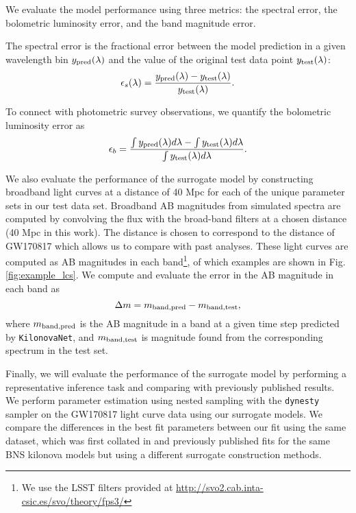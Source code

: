 \documentclass[fleqn,usenatbib,useAMS]{mnras}
\begin{document}
We evaluate the model performance using three metrics: the spectral error, the bolometric luminosity error, and the band magnitude error. 

The spectral error is the fractional error between the model prediction in a given wavelength bin $y_{\rm pred}(\lambda)$ and the value of the original test data point $y_{\rm test}(\lambda)$:
\begin{equation}
     \epsilon_{s}(\lambda) =  \frac{y_{\rm pred}(\lambda) - y_{\rm test}(\lambda)}{y_{\rm test}(\lambda)}.
\end{equation}

\noindent To connect with photometric survey observations, we quantify the bolometric luminosity error as
\begin{equation}
    \epsilon_b =  \frac{\int y_{\rm pred}(\lambda)d\lambda - \int y_{\rm test}(\lambda)d \lambda}{\int y_{\rm test}(\lambda) d \lambda}.
\end{equation}

\noindent We also evaluate the performance of the surrogate model by constructing broadband light curves at a distance of 40 Mpc for each of the unique parameter sets in our test data set.
Broadband AB magnitudes from simulated spectra are computed by convolving the flux with the broad-band filters at a chosen distance (40 Mpc in this work).
The distance is chosen to correspond to the distance of GW170817 which allows us to compare with past analyses.
These light curves are computed as AB magnitudes in each band\footnote{We use the LSST filters provided at \url{http://svo2.cab.inta-csic.es/svo/theory/fps3/}}, of which examples are shown in Fig.~ \ref{fig:example_lcs}.
We compute and evaluate the error in the AB magnitude in each band as
\begin{equation}
\Delta m = m_{\rm band, pred} - m_{\rm band, test},
\end{equation}
\noindent where $m_{\rm band,pred}$ is the AB magnitude in a band at a given time step predicted by \texttt{KilonovaNet}, and $m_{\rm band,test}$ is magnitude found from the corresponding spectrum in the test set.


Finally, we will evaluate the performance of the surrogate model by performing a representative inference task and comparing with previously published results. 
We perform parameter estimation using nested sampling with the \texttt{dynesty} \citep{speagleDynestyDynamicNested2020b} sampler on the GW170817 light curve data using our surrogate models.
We compare the differences in the best fit parameters between our fit using the same dataset, which was first collated in \cite{coughlinConstraintsNeutronStar2018} and previously published fits for the same BNS kilonova models but using a different surrogate construction methods. 
\end{document}

